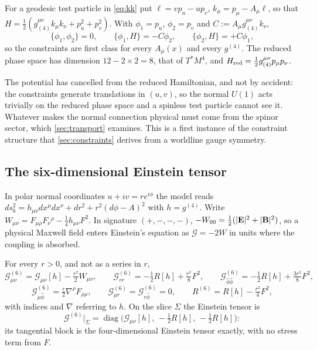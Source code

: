 \begin{proposition}
\label{prop:constraints}
For a geodesic test particle in \eqref{eq:kk} put $\ell=vp_u-up_v$, $k_\mu=p_\mu-A_\mu\ell$, so that $H=\tfrac12(g_{(4)}^{\mu\nu}k_\mu k_\nu+p_u^2+p_v^2)$. With
$\phi_1=p_u$, $\phi_2=p_v$ and $C:=A_\mu g_{(4)}^{\mu\nu}k_\nu$,
\[
\{\phi_1,\phi_2\}=0,\qquad \{\phi_1,H\}=-C\phi_2,\qquad \{\phi_2,H\}=+C\phi_1 ,
\]
so the constraints are first class for every $A_\mu(x)$ and every $g^{(4)}$. The reduced phase space has dimension $12-2\times2=8$, that of $T^*M^4$, and
$H_{\rm red}=\tfrac12g_{(4)}^{\mu\nu}p_\mu p_\nu$.
\end{proposition}

The potential has cancelled from the reduced Hamiltonian, and not by accident: the constraints generate translations in $(u,v)$, so the normal $U(1)$
acts trivially on the reduced phase space and a spinless test particle cannot see it. Whatever makes the normal connection physical must come from the
spinor sector, which \cref{sec:transport} examines. This is a first instance of the constraint structure that \cref{sec:constraints} derives from a
worldline gauge symmetry.

\subsection{The six-dimensional Einstein tensor}
\label{sec:ambientEin}

In polar normal coordinates $u+iv=re^{i\phi}$ the model reads $ds_6^2=h_{\mu\nu}dx^\mu dx^\nu+dr^2+r^2(d\phi-A)^2$ with $h=g^{(4)}$. Write
$W_{\mu\nu}=F_{\mu\rho}F_\nu{}^\rho-\tfrac14h_{\mu\nu}F^2$. In signature $(+,-,-,-)$, $-W_{00}=\tfrac12(|\mathbf E|^2+|\mathbf B|^2)$, so a physical Maxwell field enters
Einstein's equation as $\mathcal G=-2W$ in units where the coupling is absorbed.

\begin{theorem}
\label{thm:ein6}
For every $r>0$, and not as a series in $r$,
\[
\mathcal G^{(6)}_{\mu\nu}=\mathcal G_{\mu\nu}[h]-\tfrac{r^2}2W_{\mu\nu},\qquad \mathcal G^{(6)}_{rr}=-\tfrac12R[h]+\tfrac{r^2}8F^2,\qquad
\mathcal G^{(6)}_{\hat\phi\hat\phi}=-\tfrac12R[h]+\tfrac{3r^2}8F^2,
\]
\[
\mathcal G^{(6)}_{\mu\hat\phi}=\tfrac r2\nabla^\rho F_{\rho\mu},\qquad \mathcal G^{(6)}_{\mu r}=\mathcal G^{(6)}_{r\hat\phi}=0,\qquad R^{(6)}=R[h]-\tfrac{r^2}4F^2,
\]
with indices and $\nabla$ referring to $h$. On the slice $\Sigma$ the Einstein tensor is
\[
\mathcal G^{(6)}\big|_\Sigma=\operatorname{diag}\bigl(\mathcal G_{\mu\nu}[h],\,-\tfrac12R[h],\,-\tfrac12R[h]\bigr):
\]
its tangential block is the four-dimensional Einstein tensor exactly, with no stress term from $F$.
\end{theorem}

